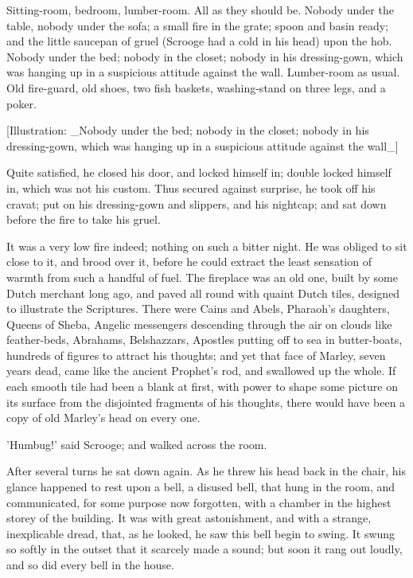 Sitting-room, bedroom, lumber-room. All as they should be. Nobody under
the table, nobody under the sofa; a small fire in the grate; spoon and
basin ready; and the little saucepan of gruel (Scrooge had a cold in his
head) upon the hob. Nobody under the bed; nobody in the closet; nobody
in his dressing-gown, which was hanging up in a suspicious attitude
against the wall. Lumber-room as usual. Old fire-guard, old shoes, two
fish baskets, washing-stand on three legs, and a poker.

[Illustration: _Nobody under the bed; nobody in the closet; nobody in
his dressing-gown, which was hanging up in a suspicious attitude against
the wall_]

Quite satisfied, he closed his door, and locked himself in; double
locked himself in, which was not his custom. Thus secured against
surprise, he took off his cravat; put on his dressing-gown and slippers,
and his nightcap; and sat down before the fire to take his gruel.

It was a very low fire indeed; nothing on such a bitter night. He was
obliged to sit close to it, and brood over it, before he could extract
the least sensation of warmth from such a handful of fuel. The fireplace
was an old one, built by some Dutch merchant long ago, and paved all
round with quaint Dutch tiles, designed to illustrate the Scriptures.
There were Cains and Abels, Pharaoh's daughters, Queens of Sheba,
Angelic messengers descending through the air on clouds like
feather-beds, Abrahams, Belshazzars, Apostles putting off to sea in
butter-boats, hundreds of figures to attract his thoughts; and yet that
face of Marley, seven years dead, came like the ancient Prophet's rod,
and swallowed up the whole. If each smooth tile had been a blank at
first, with power to shape some picture on its surface from the
disjointed fragments of his thoughts, there would have been a copy of
old Marley's head on every one.

'Humbug!' said Scrooge; and walked across the room.

After several turns he sat down again. As he threw his head back in the
chair, his glance happened to rest upon a bell, a disused bell, that
hung in the room, and communicated, for some purpose now forgotten, with
a chamber in the highest storey of the building. It was with great
astonishment, and with a strange, inexplicable dread, that, as he
looked, he saw this bell begin to swing. It swung so softly in the
outset that it scarcely made a sound; but soon it rang out loudly, and
so did every bell in the house.

